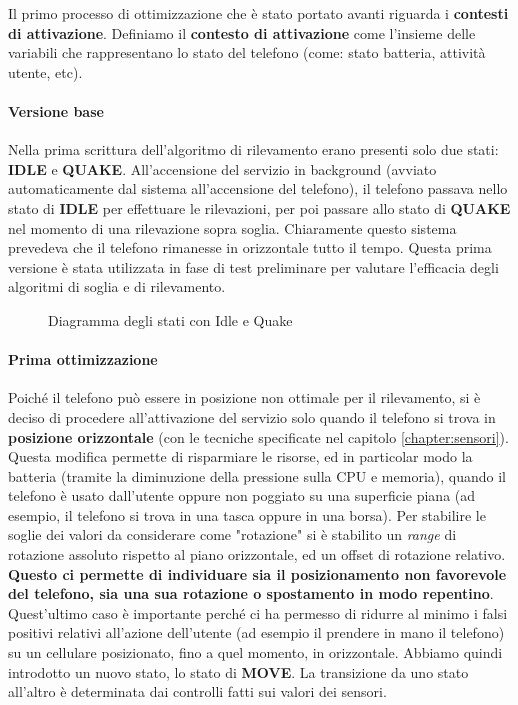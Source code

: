 \documentclass[a4paper,10pt]{memoir}
\begin{document}
Il primo processo di ottimizzazione che è stato portato avanti riguarda i \textbf{contesti di attivazione}. Definiamo il \textbf{contesto di attivazione} come l'insieme delle variabili che rappresentano lo stato del telefono (come: stato batteria, attività utente, etc).

\paragraph{Versione base} Nella prima scrittura dell'algoritmo di rilevamento erano presenti solo due stati: \textbf{IDLE} e \textbf{QUAKE}. All'accensione del servizio in background (avviato automaticamente dal sistema all'accensione del telefono), il telefono passava nello stato di \textbf{IDLE} per effettuare le rilevazioni, per poi passare allo stato di \textbf{QUAKE} nel momento di una rilevazione sopra soglia. Chiaramente questo sistema prevedeva che il telefono rimanesse in orizzontale tutto il tempo. Questa prima versione è stata utilizzata in fase di test preliminare per valutare l'efficacia degli algoritmi di soglia e di rilevamento.

\begin{figure}[ht]
\centering
\label{fig:scs_sm0}
\caption{Diagramma degli stati con Idle e Quake}
\end{figure}

\paragraph{Prima ottimizzazione} Poiché il telefono può essere in posizione non ottimale per il rilevamento, si è deciso di procedere all'attivazione del servizio solo quando il telefono si trova in \textbf{posizione orizzontale} (con le tecniche specificate nel capitolo \ref{chapter:sensori}). Questa modifica permette di risparmiare le risorse, ed in particolar modo la batteria (tramite la diminuzione della pressione sulla CPU e memoria), quando il telefono è usato dall'utente oppure non poggiato su una superficie piana (ad esempio, il telefono si trova in una tasca oppure in una borsa). Per stabilire le soglie dei valori da considerare come "rotazione" si è stabilito un \textit{range} di rotazione assoluto rispetto al piano orizzontale, ed un offset di rotazione relativo. \textbf{Questo ci permette di individuare sia il posizionamento non favorevole del telefono, sia una sua rotazione o spostamento in modo repentino}. Quest'ultimo caso è importante perché ci ha permesso di ridurre al minimo i falsi positivi relativi all'azione dell'utente (ad esempio il prendere in mano il telefono) su un cellulare posizionato, fino a quel momento, in orizzontale. Abbiamo quindi introdotto un nuovo stato, lo stato di \textbf{MOVE}. La transizione da uno stato all'altro è determinata dai controlli fatti sui valori dei sensori.
\end{document}
